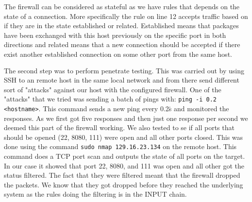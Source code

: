 The firewall can be considered as stateful as we have rules that depends on the state of a connection. More specifically the rule on line 12 accepts traffic based on if they are in the state established or related. Established means that packages have been exchanged with this host previously on the specific port in both directions and related means that a new connection should be accepted if there exist another established connection on some other port from the same host.

The second step was to perform penetrate testing. This was carried out by using SSH to an remote host in the same local network and from there send different sort of "attacks" against our host with the configured firewall. One of the "attacks" that we tried was sending a batch of pings with: \texttt{ping -i 0.2 <hostname>}. This command sends a new ping every 0.2\.s and monitored the responses. As we first got five responses and then just one response per second we deemed this part of the firewall working. We also tested to se if all ports that should be opened (22, 8080, 111) were open and all other ports closed. This was done using the command \texttt{sudo nmap 129.16.23.134} on the remote host. This command does a TCP port scan and outputs the state of all ports on the target. In our case it showed that port 22, 8080, and 111 was open and all other got the status filtered. The fact that they were filtered meant that the firewall dropped the packets. We know that they got dropped before they reached the underlying system as the rules doing the filtering is in the INPUT chain.